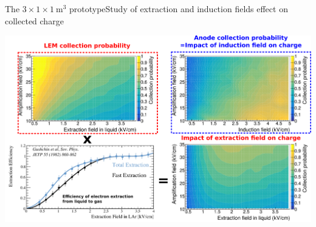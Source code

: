 \documentclass[10pt]{beamer}
\begin{document}
    \begin{frame}{The \texorpdfstring{$3 \times 1 \times \SI{1}{\meter\cubed}$}{311} prototype}{Study of extraction and induction fields effect on collected charge}
    	\begin{scriptsize}
    		\centering \includegraphics[width=\textwidth]{figures/311/effs.png}\\
    	\end{scriptsize} 
    \end{frame}
    

    
\end{document}
